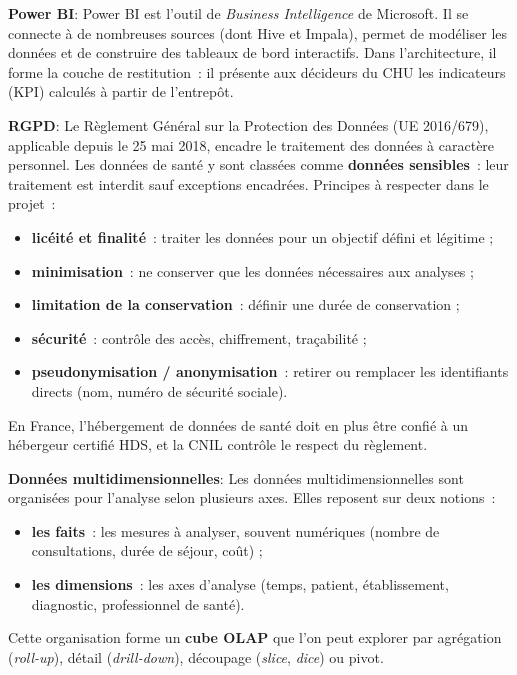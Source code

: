 \noindent \textbf{Power BI}:
\noindent Power BI est l'outil de \textit{Business Intelligence} de Microsoft. Il se connecte à de nombreuses sources (dont Hive et Impala), permet de modéliser les données et de construire des tableaux de bord interactifs. Dans l'architecture, il forme la couche de restitution~: il présente aux décideurs du CHU les indicateurs (KPI) calculés à partir de l'entrepôt.

\separateur

\noindent \textbf{RGPD}:
\noindent Le Règlement Général sur la Protection des Données (UE 2016/679), applicable depuis le 25 mai 2018, encadre le traitement des données à caractère personnel. Les données de santé y sont classées comme \textbf{données sensibles}~: leur traitement est interdit sauf exceptions encadrées. Principes à respecter dans le projet~:
\begin{itemize}
	\item \textbf{licéité et finalité}~: traiter les données pour un objectif défini et légitime ;
	\item \textbf{minimisation}~: ne conserver que les données nécessaires aux analyses ;
	\item \textbf{limitation de la conservation}~: définir une durée de conservation ;
	\item \textbf{sécurité}~: contrôle des accès, chiffrement, traçabilité ;
	\item \textbf{pseudonymisation / anonymisation}~: retirer ou remplacer les identifiants directs (nom, numéro de sécurité sociale).
\end{itemize}
En France, l'hébergement de données de santé doit en plus être confié à un hébergeur certifié HDS, et la CNIL contrôle le respect du règlement.

\separateur

\noindent \textbf{Données multidimensionnelles}:
\noindent Les données multidimensionnelles sont organisées pour l'analyse selon plusieurs axes. Elles reposent sur deux notions~:
\begin{itemize}
	\item \textbf{les faits}~: les mesures à analyser, souvent numériques (nombre de consultations, durée de séjour, coût) ;
	\item \textbf{les dimensions}~: les axes d'analyse (temps, patient, établissement, diagnostic, professionnel de santé).
\end{itemize}
Cette organisation forme un \textbf{cube OLAP} que l'on peut explorer par agrégation (\textit{roll-up}), détail (\textit{drill-down}), découpage (\textit{slice}, \textit{dice}) ou pivot.

